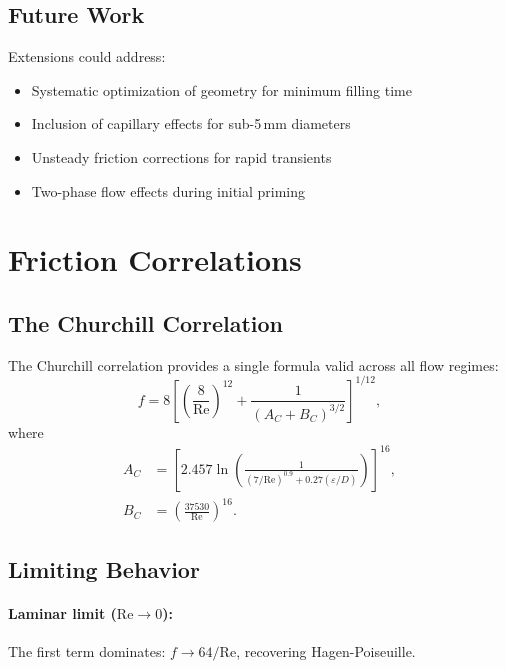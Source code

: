 \documentclass[11pt,a4paper]{article}
\theoremstyle{definition}
\begin{document}
\subsection{Future Work}

Extensions could address:
\begin{itemize}[nosep,leftmargin=2em]
  \item Systematic optimization of geometry for minimum filling time
  \item Inclusion of capillary effects for sub-5\,mm diameters
  \item Unsteady friction corrections for rapid transients
  \item Two-phase flow effects during initial priming
\end{itemize}

\appendix
\section{Friction Correlations}
\label{app:friction}

\subsection{The Churchill Correlation}

The Churchill correlation \citep{churchill1977friction} provides a single formula valid across all flow regimes:
\begin{equation}
  f = 8\left[\left(\frac{8}{\text{Re}}\right)^{12} + \frac{1}{(A_C + B_C)^{3/2}}\right]^{1/12},
  \label{eq:churchill-full}
\end{equation}
where
\begin{align}
  A_C &= \left[2.457\ln\left(\frac{1}{(7/\text{Re})^{0.9} + 0.27(\varepsilon/D)}\right)\right]^{16}, \\
  B_C &= \left(\frac{37530}{\text{Re}}\right)^{16}.
\end{align}

\subsection{Limiting Behavior}

\paragraph{Laminar limit ($\text{Re} \to 0$):}
The first term dominates: $f \to 64/\text{Re}$, recovering Hagen-Poiseuille.
\end{document}
